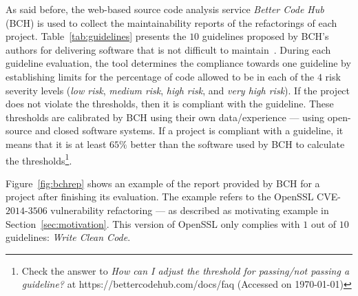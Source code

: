\documentclass[10pt,conference]{IEEEtran}
\begin{document}
As said before, the web-based source code analysis service \emph{Better Code
Hub} (BCH) is used to collect the maintainability reports of the refactorings of
each project. Table~\ref{tab:guidelines} presents the $10$ guidelines proposed
by BCH's authors for delivering software that is not difficult to
maintain~\cite{Visser:2016:OREILLY}. During each guideline evaluation, the tool
determines the compliance towards one guideline by establishing limits for the
percentage of code allowed to be in each of the $4$ risk severity levels
(\emph{low risk}, \emph{medium risk}, \emph{high risk}, and \emph{very high
risk}). If the project does not violate the thresholds, then it is compliant
with the guideline. These thresholds are calibrated by BCH using their own
data/experience --- using open-source and closed software systems. If a project is
compliant with a guideline, it means that it is at least $65\%$ better than the
software used by BCH to calculate the thresholds\footnote{Check the answer to
\emph{How can I adjust the threshold for passing/not passing a guideline?} at
https://bettercodehub.com/docs/faq (Accessed on \today{})}.

Figure~\ref{fig:bchrep} shows an example of the report
provided by BCH for a project after finishing its evaluation. The example
refers to the OpenSSL CVE-$2014$-$3506$ vulnerability refactoring ---
as described as motivating example in Section~\ref{sec:motivation}. This
version of OpenSSL only complies with $1$ out of $10$ guidelines: \emph{Write
Clean Code}.
\end{document}
